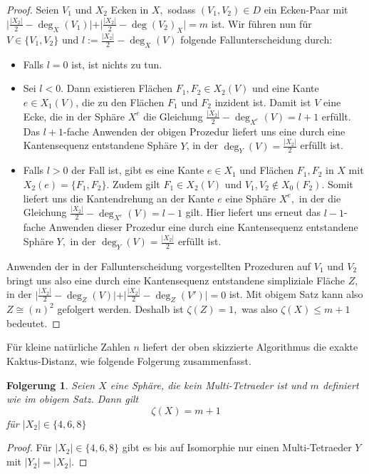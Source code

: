 \documentclass[12pt,titlepage,twoside,cleardoublepage]{article}
\theoremstyle{nummermitklammern}
\newtheorem{folgerung}[temp]{Folgerung}
\newtheorem{folgerung}[zahl]{Folgerung}
\numberwithin{equation}{section}
\begin{document}
\begin{proof}
Seien $V_1$ und $X_2$ Ecken in $X,$ sodass $(V_1,V_2)\in D$ ein Ecken-Paar mit 
$\vert\frac{\vert X_2 \vert}{2}-\deg_X(V_1)\vert +\vert \frac{\vert X_2 \vert}{2}-\deg(V_2)_X\vert=m$ ist.
Wir führen nun für $V \in \{V_1,V_2\}$ und $l:=\frac{\vert X_2 \vert}{2}-\deg_X(V)$ folgende Fallunterscheidung durch:
\begin{itemize}
\item Falls $l=0$ ist, ist nichts zu tun.
\item Sei $l<0$. Dann existieren Flächen $F_1,F_2 \in X_2(V)$ und eine Kante $e\in X_1(V)$, die zu den Flächen $F_1$ und $F_2$ inzident ist. Damit ist $V$ eine Ecke, die in der Sphäre $X^e$ die Gleichung $\frac{\vert X_2\vert }{2}-\deg_{X^e}(V)=l+1$ erfüllt. Das $l+1$-fache Anwenden der obigen Prozedur liefert uns eine durch eine Kantensequenz entstandene Sphäre $Y$, in der $\deg_Y(V)=\frac{\vert X_2\vert }{2}$ erfüllt ist. 
 \item Falls $l>0$ der Fall ist, gibt es eine Kante $e\in X_1$ und Flächen $F_1,F_2$ in $X$ mit $X_2(e)=\{F_1,F_2\}$. Zudem gilt $F_1\in X_2(V)$ und $V_1,V_2 \notin X_0(F_2)$. Somit liefert uns die Kantendrehung an der Kante $e$ eine Sphäre $X^e,$ in der die  Gleichung $\frac{\vert X_2\vert }{2}-\deg_{X^e}(V)=l-1$ gilt. Hier liefert uns erneut das $l-1$-fache Anwenden dieser Prozedur eine durch eine Kantensequenz entstandene Sphäre $Y,$ in der $\deg_Y(V)=\frac{\vert X_2\vert }{2}$ erfüllt ist.
\end{itemize}  
 Anwenden der in der Fallunterscheidung vorgestellten Prozeduren auf $V_1$ und $V_2$ bringt uns also eine durch eine Kantensequenz entstandene simpliziale Fläche $Z$, in der $\vert\frac{\vert X_2 \vert}{2}-\deg_Z(V)\vert +\vert \frac{\vert X_2 \vert}{2}-\deg_Z(V')\vert=0$ ist. Mit obigem Satz kann also $Z\cong (n)^2$ gefolgert werden. Deshalb ist $\zeta(Z)=1,$ was also $\zeta(X)\leq m+1$ bedeutet. 
\end{proof}

Für kleine natürliche Zahlen $n$ liefert der oben skizzierte Algorithmus die exakte Kaktus-Distanz, wie folgende Folgerung zusammenfasst. 
\begin{folgerung}
Seien $X$ eine Sphäre, die kein Multi-Tetraeder ist und $m$ definiert wie im obigem Satz. Dann gilt 
\[
\zeta(X)= m+1
\]
 für $\vert X_2 \vert \in \{4,6,8\}$ 
\end{folgerung}
\begin{proof}
Für $\vert X_2 \vert \in \{4,6,8\}$ gibt es bis auf Isomorphie nur einen Multi-Tetraeder $Y$ mit $\vert Y_2\vert=\vert X_2\vert.$
\end{proof}
\end{document}
